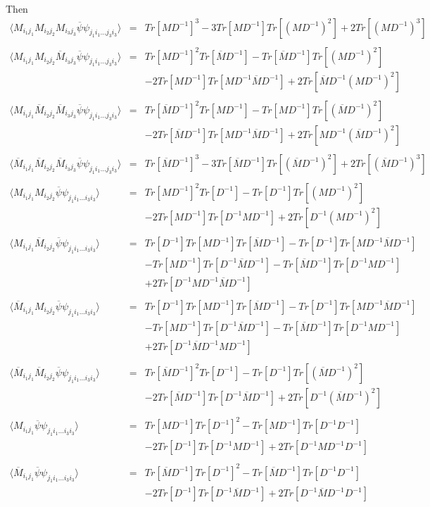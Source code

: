 \documentclass[a4paper,10pt]{report}
\newcommand{\ol}[1]{\overline{#1}}
\newcommand{\Mb}{\ol{M}}
\newcommand{\mv}[1]{\langle #1 \rangle}
\newcommand{\ppb}{\ol{\psi}\psi}
\newcommand{\D}{D^{-1}}
\begin{document}
\newpage
\noindent Then
\begin{eqnarray}
\mv{M_{i_1j_1}M_{i_2j_2}M_{i_3j_3} \ppb_{j_1i_1...j_3i_3}} &=& 
Tr[M\D]^3 - 3 Tr[M\D]Tr[(M\D)^2] + 2Tr[(M\D)^3] \nonumber\\
\nonumber\\
\mv{M_{i_1j_1}M_{i_2j_2}\Mb_{i_3j_3} \ppb_{j_1i_1...j_3i_3}} &=& 
Tr[M\D]^2Tr[\Mb\D] - Tr[\Mb\D]Tr[(M\D)^2] \nonumber \\
&& - 2 Tr[M\D]Tr[M\D \Mb\D] +  2Tr[\Mb\D(M\D)^2] \nonumber\\
\nonumber\\
\mv{M_{i_1j_1}\Mb_{i_2j_2}\Mb_{i_3j_3} \ppb_{j_1i_1...j_3i_3}} &=& 
Tr[\Mb\D]^2Tr[M\D] - Tr[M\D]Tr[(\Mb\D)^2] \nonumber \\
&& - 2 Tr[\Mb\D]Tr[M\D \Mb\D] +  2Tr[M\D(\Mb\D)^2] \nonumber\\
\nonumber\\
\mv{\Mb_{i_1j_1}\Mb_{i_2j_2}\Mb_{i_3j_3} \ppb_{j_1i_1...j_3i_3}} &=& 
Tr[\Mb\D]^3 - 3 Tr[\Mb\D]Tr[(\Mb\D)^2] + 2Tr[(\Mb\D)^3] \nonumber\\
\nonumber\\
%
\mv{M_{i_1j_1}M_{i_2j_2} \ppb_{j_1i_1...i_3i_3}} &=& 
Tr[M\D]^2Tr[\D] - Tr[\D]Tr[(M\D)^2] \nonumber \\
&& - 2 Tr[M\D]Tr[\D M\D] +  2Tr[\D(M\D)^2] \nonumber\\
\nonumber\\
\mv{M_{i_1j_1}\Mb_{i_2j_2} \ppb_{j_1i_1...i_3i_3}} &=& 
Tr[\D]Tr[M\D]Tr[\Mb\D] - Tr[\D]Tr[M\D \Mb \D] \nonumber \\
&& - Tr[M \D]Tr[\D\Mb\D] - Tr[\Mb\D]Tr[\D M \D] \nonumber\\
&& +  2Tr[\D M\D\Mb\D] \nonumber\\
\nonumber\\
\mv{\Mb_{i_1j_1}M_{i_2j_2} \ppb_{j_1i_1...i_3i_3}} &=& 
Tr[\D]Tr[M\D]Tr[\Mb\D] - Tr[\D]Tr[M\D \Mb \D] \nonumber \\
&& - Tr[M \D]Tr[\D\Mb\D] - Tr[\Mb\D]Tr[\D M \D]\nonumber\\
&& +  2Tr[\D\Mb\D M\D] \nonumber\\
\nonumber\\
\mv{\Mb_{i_1j_1}\Mb_{i_2j_2} \ppb_{j_1i_1...i_3i_3}} &=& 
Tr[\Mb\D]^2Tr[\D] - Tr[\D]Tr[(\Mb\D)^2] \nonumber \\
&& - 2 Tr[\Mb\D]Tr[\D \Mb\D] +  2Tr[\D(\Mb\D)^2] \nonumber\\
%
\nonumber\\
\mv{M_{i_1j_1} \ppb_{j_1i_1...i_3i_3}} &=& 
Tr[M\D]Tr[\D]^2 - Tr[M\D]Tr[\D\D] \nonumber \\
&& - 2 Tr[\D]Tr[\D M\D] +  2Tr[\D M\D\D] \nonumber\\
\nonumber\\
\mv{\Mb_{i_1j_1} \ppb_{j_1i_1...i_3i_3}} &=& 
Tr[\Mb\D]Tr[\D]^2 - Tr[\Mb\D]Tr[\D\D] \nonumber \\
&& - 2 Tr[\D]Tr[\D \Mb\D] +  2Tr[\D\Mb\D\D] \nonumber
\end{eqnarray}
\end{document}
